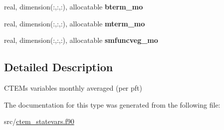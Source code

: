\begin{DoxyCompactItemize}
\item 
\hypertarget{structctem__statevars_1_1ctem__monthly_a86d2031ed7e8af17c48ec18f18cba77b}{}real, dimension(\+:,\+:,\+:), allocatable {\bfseries bterm\+\_\+mo}\label{structctem__statevars_1_1ctem__monthly_a86d2031ed7e8af17c48ec18f18cba77b}

\item 
\hypertarget{structctem__statevars_1_1ctem__monthly_a7e327a9d229cbc9698ce0e03fd10d358}{}real, dimension(\+:,\+:,\+:), allocatable {\bfseries mterm\+\_\+mo}\label{structctem__statevars_1_1ctem__monthly_a7e327a9d229cbc9698ce0e03fd10d358}

\item 
\hypertarget{structctem__statevars_1_1ctem__monthly_a6ad7adaeb9e3b1890f7ca7e44da3a68f}{}real, dimension(\+:,\+:,\+:), allocatable {\bfseries smfuncveg\+\_\+mo}\label{structctem__statevars_1_1ctem__monthly_a6ad7adaeb9e3b1890f7ca7e44da3a68f}

\end{DoxyCompactItemize}


\subsection{Detailed Description}
C\+T\+E\+M\textquotesingle{}s variables monthly averaged (per pft) 

The documentation for this type was generated from the following file\+:\begin{DoxyCompactItemize}
\item 
src/\hyperlink{ctem__statevars_8f90}{ctem\+\_\+statevars.\+f90}\end{DoxyCompactItemize}
